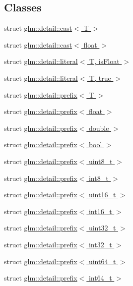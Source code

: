 \subsection*{Classes}
\begin{DoxyCompactItemize}
\item 
struct \hyperlink{structglm_1_1detail_1_1cast}{glm\+::detail\+::cast$<$ T $>$}
\item 
struct \hyperlink{structglm_1_1detail_1_1cast_3_01float_01_4}{glm\+::detail\+::cast$<$ float $>$}
\item 
struct \hyperlink{structglm_1_1detail_1_1literal}{glm\+::detail\+::literal$<$ T, is\+Float $>$}
\item 
struct \hyperlink{structglm_1_1detail_1_1literal_3_01T_00_01true_01_4}{glm\+::detail\+::literal$<$ T, true $>$}
\item 
struct \hyperlink{structglm_1_1detail_1_1prefix}{glm\+::detail\+::prefix$<$ T $>$}
\item 
struct \hyperlink{structglm_1_1detail_1_1prefix_3_01float_01_4}{glm\+::detail\+::prefix$<$ float $>$}
\item 
struct \hyperlink{structglm_1_1detail_1_1prefix_3_01double_01_4}{glm\+::detail\+::prefix$<$ double $>$}
\item 
struct \hyperlink{structglm_1_1detail_1_1prefix_3_01bool_01_4}{glm\+::detail\+::prefix$<$ bool $>$}
\item 
struct \hyperlink{structglm_1_1detail_1_1prefix_3_01uint8__t_01_4}{glm\+::detail\+::prefix$<$ uint8\+\_\+t $>$}
\item 
struct \hyperlink{structglm_1_1detail_1_1prefix_3_01int8__t_01_4}{glm\+::detail\+::prefix$<$ int8\+\_\+t $>$}
\item 
struct \hyperlink{structglm_1_1detail_1_1prefix_3_01uint16__t_01_4}{glm\+::detail\+::prefix$<$ uint16\+\_\+t $>$}
\item 
struct \hyperlink{structglm_1_1detail_1_1prefix_3_01int16__t_01_4}{glm\+::detail\+::prefix$<$ int16\+\_\+t $>$}
\item 
struct \hyperlink{structglm_1_1detail_1_1prefix_3_01uint32__t_01_4}{glm\+::detail\+::prefix$<$ uint32\+\_\+t $>$}
\item 
struct \hyperlink{structglm_1_1detail_1_1prefix_3_01int32__t_01_4}{glm\+::detail\+::prefix$<$ int32\+\_\+t $>$}
\item 
struct \hyperlink{structglm_1_1detail_1_1prefix_3_01uint64__t_01_4}{glm\+::detail\+::prefix$<$ uint64\+\_\+t $>$}
\item 
struct \hyperlink{structglm_1_1detail_1_1prefix_3_01int64__t_01_4}{glm\+::detail\+::prefix$<$ int64\+\_\+t $>$}

\end{DoxyCompactItemize}
